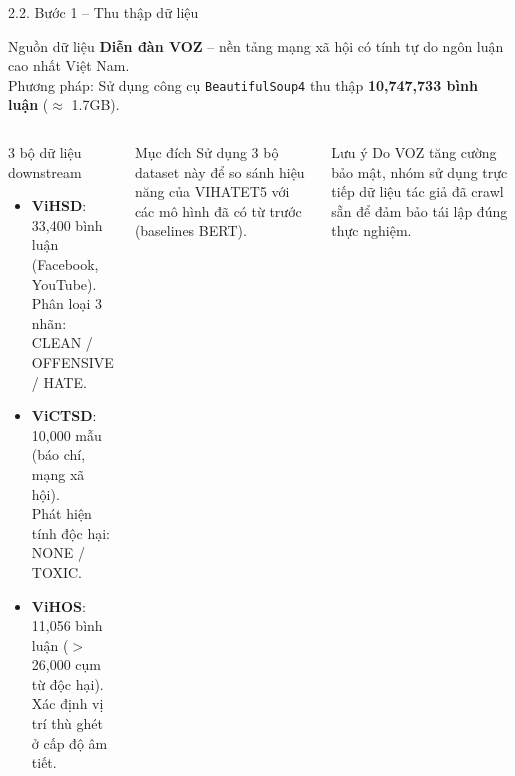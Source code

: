\documentclass[11pt, aspectratio=169]{beamer}
\begin{document}
\begin{frame}[fragile, shrink=20]{2.2. Bước 1 -- Thu thập dữ liệu}

\begin{block}{Nguồn dữ liệu}
  \textbf{Diễn đàn VOZ} -- nền tảng mạng xã hội có tính tự do ngôn luận cao nhất Việt Nam.\\
  Phương pháp: Sử dụng công cụ \texttt{BeautifulSoup4} thu thập \textbf{10,747,733 bình luận} ($\approx$ 1.7GB).
\end{block}

\vspace{0.2cm}
\begin{columns}[T]
  \begin{block}{3 bộ dữ liệu downstream}
    \begin{itemize}
      \item \textbf{ViHSD}: 33,400 bình luận (Facebook, YouTube).\\
        Phân loại 3 nhãn: CLEAN / OFFENSIVE / HATE.
      \item \textbf{ViCTSD}: 10,000 mẫu (báo chí, mạng xã hội).\\
        Phát hiện tính độc hại: NONE / TOXIC.
      \item \textbf{ViHOS}: 11,056 bình luận ($>$26,000 cụm từ độc hại).\\
        Xác định vị trí thù ghét ở cấp độ âm tiết.
    \end{itemize}
  \end{block}

  \begin{block}{Mục đích}
    Sử dụng 3 bộ dataset này để so sánh hiệu năng của VIHATET5 với các mô hình đã có từ trước (baselines BERT).
  \end{block}

  \vspace{0.3cm}
  \begin{block}{Lưu ý}
    Do VOZ tăng cường bảo mật, nhóm sử dụng trực tiếp dữ liệu tác giả đã crawl sẵn để đảm bảo tái lập đúng thực nghiệm.
  \end{block}
\end{columns}
\end{frame}
\end{document}
